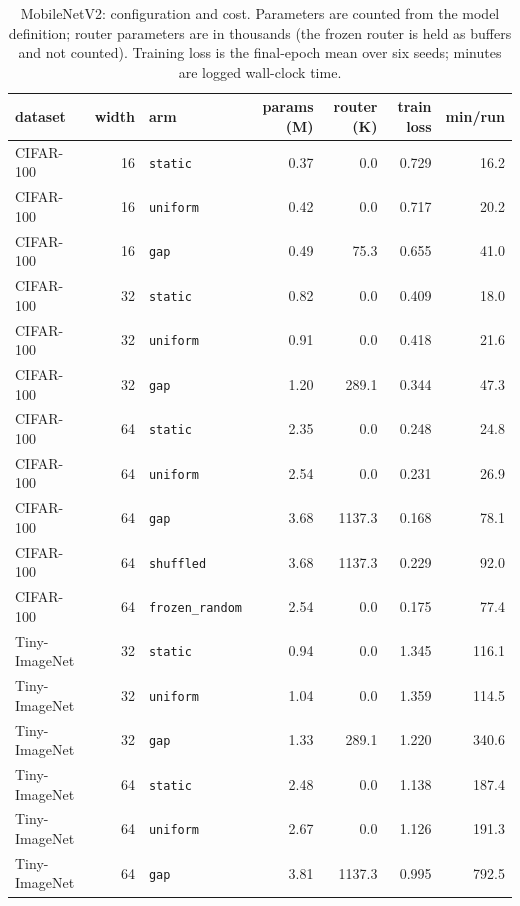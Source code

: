 \documentclass[10pt,a4paper]{article}
\begin{document}
\begin{table}[h]\centering\small
\caption{MobileNetV2: configuration and cost. Parameters are counted from
the model definition; router parameters are in thousands (the frozen
router is held as buffers and not counted). Training loss is the
final-epoch mean over six seeds; minutes are logged wall-clock time.}
\label{tab:mbconfig}
\begin{tabular}{l r l rr r r}
\toprule
dataset & width & arm & params (M) & router (K) & train loss & min/run \\
\midrule
CIFAR-100 & 16 & \texttt{static} & 0.37 & 0.0 & 0.729 & 16.2 \\
CIFAR-100 & 16 & \texttt{uniform} & 0.42 & 0.0 & 0.717 & 20.2 \\
CIFAR-100 & 16 & \texttt{gap} & 0.49 & 75.3 & 0.655 & 41.0 \\
CIFAR-100 & 32 & \texttt{static} & 0.82 & 0.0 & 0.409 & 18.0 \\
CIFAR-100 & 32 & \texttt{uniform} & 0.91 & 0.0 & 0.418 & 21.6 \\
CIFAR-100 & 32 & \texttt{gap} & 1.20 & 289.1 & 0.344 & 47.3 \\
CIFAR-100 & 64 & \texttt{static} & 2.35 & 0.0 & 0.248 & 24.8 \\
CIFAR-100 & 64 & \texttt{uniform} & 2.54 & 0.0 & 0.231 & 26.9 \\
CIFAR-100 & 64 & \texttt{gap} & 3.68 & 1137.3 & 0.168 & 78.1 \\
CIFAR-100 & 64 & \texttt{shuffled} & 3.68 & 1137.3 & 0.229 & 92.0 \\
CIFAR-100 & 64 & \texttt{frozen\_random} & 2.54 & 0.0 & 0.175 & 77.4 \\
Tiny-ImageNet & 32 & \texttt{static} & 0.94 & 0.0 & 1.345 & 116.1 \\
Tiny-ImageNet & 32 & \texttt{uniform} & 1.04 & 0.0 & 1.359 & 114.5 \\
Tiny-ImageNet & 32 & \texttt{gap} & 1.33 & 289.1 & 1.220 & 340.6 \\
Tiny-ImageNet & 64 & \texttt{static} & 2.48 & 0.0 & 1.138 & 187.4 \\
Tiny-ImageNet & 64 & \texttt{uniform} & 2.67 & 0.0 & 1.126 & 191.3 \\
Tiny-ImageNet & 64 & \texttt{gap} & 3.81 & 1137.3 & 0.995 & 792.5 \\
\bottomrule
\end{tabular}
\end{table}
\end{document}
